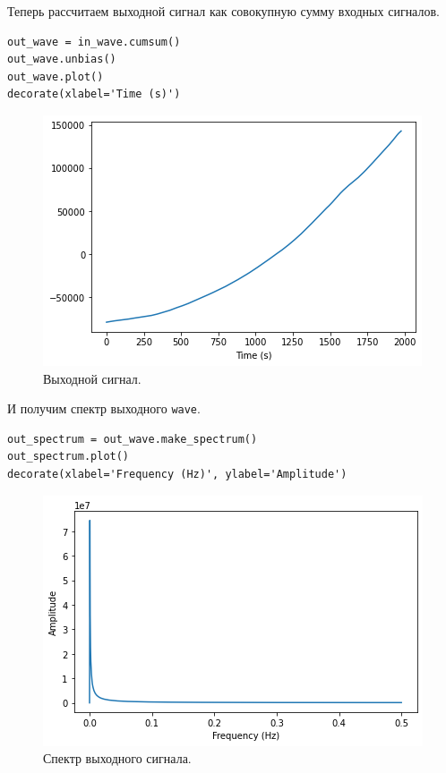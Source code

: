 \documentclass[a4paper, 14pt]{extarticle}
\begin{document}
    Теперь рассчитаем выходной сигнал как совокупную сумму входных сигналов.

    \begin{lstlisting}[caption= Рассчёт выходного сигнала., label={lst:task1_out_wave}]
out_wave = in_wave.cumsum()
out_wave.unbias()
out_wave.plot()
decorate(xlabel='Time (s)') \end{lstlisting}

    \begin{figure}[H]
        \centering
        \includegraphics[width=0.7\linewidth]{resources/Images/task1_out_wave}
        \caption{Выходной сигнал.}
        \label{fig:task1_out_wave}
    \end{figure}

    И получим спектр выходного \texttt{wave}.

    \begin{lstlisting}[caption= Получение спектра выходного сигнала., label={lst:task1_out_spectrum}]
out_spectrum = out_wave.make_spectrum()
out_spectrum.plot()
decorate(xlabel='Frequency (Hz)', ylabel='Amplitude')   \end{lstlisting}

    \begin{figure}[h]
        \centering
        \includegraphics[width=0.7\linewidth]{resources/Images/task1_out_spectrum}
        \caption{Спектр выходного сигнала.}
        \label{fig:task1_out_spectrum}
    \end{figure}
\end{document}
